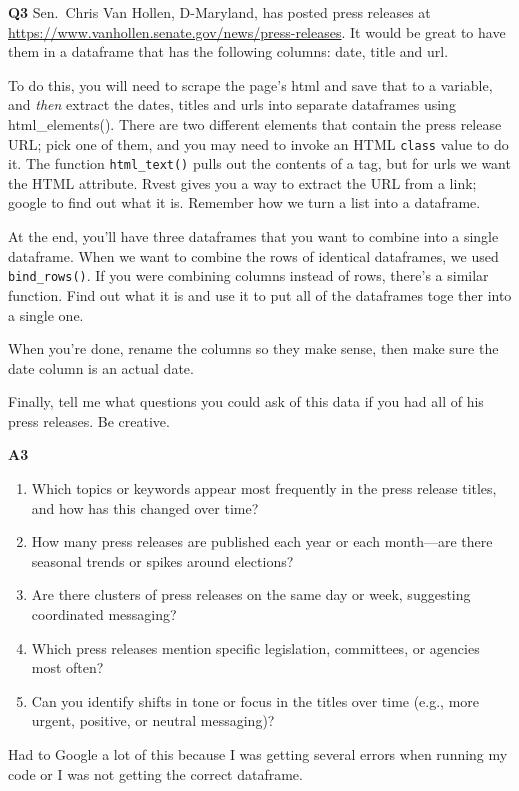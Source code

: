 \documentclass[
]{article}
\begin{document}
\textbf{Q3} Sen.~Chris Van Hollen, D-Maryland, has posted press releases
at \url{https://www.vanhollen.senate.gov/news/press-releases}. It would
be great to have them in a dataframe that has the following columns:
date, title and url.

To do this, you will need to scrape the page's html and save that to a
variable, and \emph{then} extract the dates, titles and urls into
separate dataframes using html\_elements(). There are two different
elements that contain the press release URL; pick one of them, and you
may need to invoke an HTML \texttt{class} value to do it. The function
\texttt{html\_text()} pulls out the contents of a tag, but for urls we
want the HTML attribute. Rvest gives you a way to extract the URL from a
link; google to find out what it is. Remember how we turn a list into a
dataframe.

At the end, you'll have three dataframes that you want to combine into a
single dataframe. When we want to combine the rows of identical
dataframes, we used \texttt{bind\_rows()}. If you were combining columns
instead of rows, there's a similar function. Find out what it is and use
it to put all of the dataframes toge ther into a single one.

When you're done, rename the columns so they make sense, then make sure
the date column is an actual date.

Finally, tell me what questions you could ask of this data if you had
all of his press releases. Be creative.

\textbf{A3}

\begin{enumerate}
\def\labelenumi{\arabic{enumi}.}
\item
  Which topics or keywords appear most frequently in the press release
  titles, and how has this changed over time?
\item
  How many press releases are published each year or each month---are
  there seasonal trends or spikes around elections?
\item
  Are there clusters of press releases on the same day or week,
  suggesting coordinated messaging?
\item
  Which press releases mention specific legislation, committees, or
  agencies most often?
\item
  Can you identify shifts in tone or focus in the titles over time
  (e.g., more urgent, positive, or neutral messaging)?
\end{enumerate}

Had to Google a lot of this because I was getting several errors when
running my code or I was not getting the correct dataframe.
\end{document}

